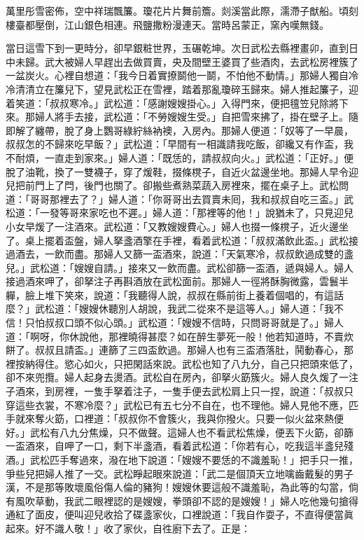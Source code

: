 \begin{myquote}
萬里彤雪密佈，空中祥瑞飄簾。瓊花片片舞前簷。剡溪當此際，濡滯子猷船。頃刻樓臺都壓倒，江山銀色相連。飛鹽撒粉漫連天。當時呂蒙正，窯內嘆無錢。
\end{myquote}

當日這雪下到一更時分，卻早銀粧世界，玉碾乾坤。次日武松去縣裡畫卯，直到日中未歸。武大被婦人早趕出去做買賣，央及間壁王婆買了些酒肉，{}去武松房裡簇了一盆炭火。心裡自想道：「我今日着實撩鬬他一鬬，不怕他不動情。」那婦人獨自冷冷清清立在簾兒下，望見武松正在雪裡，踏着那亂瓊碎玉歸來。婦人推起簾子，迎着笑道：「叔叔寒冷。」武松道：「感謝嫂嫂掛心。」入得門來，便把氊笠兒除將下來。那婦人將手去接，武松道：「不勞嫂嫂生受。」自把雪來拂了，{}掛在壁子上。隨即解了纏帶，脫了身上鸚哥綠紵絲衲襖，入房內。那婦人便道：「奴等了一早晨，叔叔怎的不歸來吃早飯？」武松道：「早間有一相識請我吃飯，卻纔又有作盃，我不耐煩，一直走到家來。」婦人道：「既恁的，請叔叔向火。」武松道：「正好。」便脫了油靴，換了一雙襪子，穿了煖鞋，掇條櫈子，自近火盆邊坐地。{}那婦人早令迎兒把前門上了閂，後門也關了。卻搬些煮熟菜蔬入房裡來，擺在桌子上。武松問道：「哥哥那裡去了？」婦人道：「你哥哥出去買賣未囘，我和叔叔自吃三盃。」武松道：「一發等哥來家吃也不遲。」婦人道：「那裡等的他！」說猶未了，只見迎兒小女早煖了一注酒來。武松道：「又教嫂嫂費心。」婦人也掇一條櫈子，近火邊坐了。桌上擺着盃盤，婦人拏盞酒擎在手裡，看着武松道：「叔叔滿飲此盃。」武松接過酒去，一飲而盡。那婦人又篩一盃酒來，說道：「天氣寒冷，叔叔飲過成雙的盞兒。」{}武松道：「嫂嫂自請。」接來又一飲而盡。武松卻篩一盃酒，遞與婦人。婦人接過酒來呷了，卻拏注子再斟酒放在武松面前。那婦人一徑將酥胸微露，雲鬟半軃，{}臉上堆下笑來，說道：「我聽得人說，叔叔在縣前街上養着個唱的，有這話麼？」{}武松道：「嫂嫂休聽別人胡說，我武二從來不是這等人。」{}婦人道：「我不信！只怕叔叔口頭不似心頭。」武松道：「嫂嫂不信時，只問哥哥就是了。」婦人道：「啊呀，你休說他，那裡曉得甚麼？{}如在醉生夢死一般！{}他若知道時，不賣炊餅了。叔叔且請盃。」連篩了三四盃飲過。那婦人也有三盃酒落肚，鬨動春心，那裡按納得住。慾心如火，只把閑話來說。武松也知了八九分，自己只把頭來低了，卻不來兜攬。婦人起身去燙酒。武松自在房內，卻拏火筯簇火。{}婦人良久煖了一注子酒來，到房裡，一隻手拏着注子，一隻手便去武松肩上只一捏，說道：「叔叔只穿這些衣裳，不寒冷麼？」武松已有五七分不自在，也不理他。{}婦人見他不應，匹手就來奪火筯，口裡道：「叔叔你不會簇火，我與你撥火。只要一似火盆來熱便好。」武松有八九分焦燥，只不做聲。這婦人也不看武松焦燥，{}便丟下火筯，卻篩一盃酒來，自呷了一口，剩下半盞酒，看着武松道：「你若有心，吃我這半盞兒殘酒。」武松匹手奪過來，{}潑在地下說道：「嫂嫂不要恁的不識羞恥！」{}把手只一推，爭些兒把婦人推了一交。{}武松睜起眼來說道：「武二是個頂天立地噙齒戴髮的男子漢，不是那等敗壞風俗傷人倫的豬狗！{}嫂嫂休要這般不識羞恥，為此等的勾當，倘有風吹草動，我武二眼裡認的是嫂嫂，拳頭卻不認的是嫂嫂！」{}婦人吃他幾句搶得通紅了面皮，便叫迎兒收拾了碟盞家伙，{}口裡說道：「我自作耍子，不直得便當眞起來。好不識人敬！」{}收了家伙，自徃廚下去了。正是：

